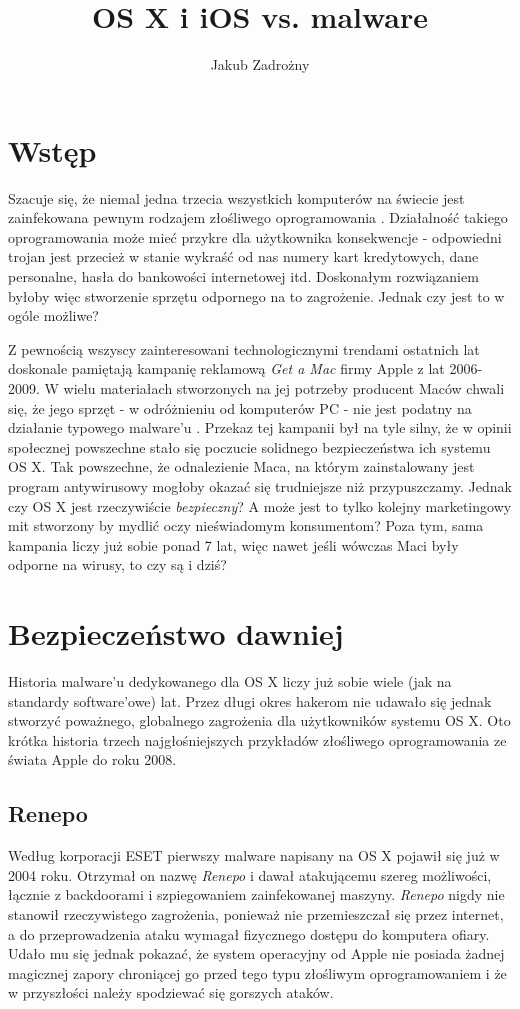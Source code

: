 \documentclass[polish]{kbk}
\begin{document}
\author{Jakub Zadrożny}
\title{OS X i iOS vs. malware}

\maketitle

\section{Wstęp}
Szacuje się, że niemal jedna trzecia wszystkich komputerów na świecie jest zainfekowana pewnym rodzajem złośliwego oprogramowania \cite{malware-scale}. Działalność takiego oprogramowania może mieć przykre dla użytkownika konsekwencje - odpowiedni trojan jest przecież w stanie wykraść od nas numery kart kredytowych, dane personalne, hasła do bankowości internetowej itd. Doskonałym rozwiązaniem byłoby więc stworzenie sprzętu odpornego na to zagrożenie. Jednak czy jest to w ogóle możliwe?

Z pewnością wszyscy zainteresowani technologicznymi trendami ostatnich lat doskonale pamiętają kampanię reklamową \textit{Get a Mac} firmy Apple z lat 2006-2009. W wielu materiałach stworzonych na jej potrzeby producent Maców chwali się, że jego sprzęt - w odróżnieniu od komputerów PC - nie jest podatny na działanie typowego malware'u \cite{get-a-mac}. Przekaz tej kampanii był na tyle silny, że w opinii społecznej powszechne stało się poczucie solidnego bezpieczeństwa ich systemu OS X. Tak powszechne, że odnalezienie Maca, na którym zainstalowany jest program antywirusowy mogłoby okazać się trudniejsze niż przypuszczamy. Jednak czy OS X jest rzeczywiście \textit{bezpieczny}? A może jest to tylko kolejny marketingowy mit stworzony by mydlić oczy nieświadomym konsumentom? Poza tym, sama kampania liczy już sobie ponad 7 lat, więc nawet jeśli wówczas Maci były odporne na wirusy, to czy są i dziś?

\section{Bezpieczeństwo dawniej}
Historia malware'u dedykowanego dla OS X liczy już sobie wiele (jak na standardy software'owe) lat. Przez długi okres hakerom nie udawało się jednak stworzyć poważnego, globalnego zagrożenia dla użytkowników systemu OS X. Oto krótka historia trzech najgłośniejszych przykładów złośliwego oprogramowania ze świata Apple do roku 2008.

\subsection{Renepo \cite{renepo}}
Według korporacji ESET pierwszy malware napisany na OS X pojawił się już w 2004 roku. Otrzymał on nazwę \textit{Renepo} i dawał atakującemu szereg możliwości, łącznie z backdoorami i szpiegowaniem zainfekowanej maszyny. \textit{Renepo} nigdy nie stanowił rzeczywistego zagrożenia, ponieważ nie przemieszczał się przez internet, a do przeprowadzenia ataku wymagał fizycznego dostępu do komputera ofiary. Udało mu się jednak pokazać, że system operacyjny od Apple nie posiada żadnej magicznej zapory chroniącej go przed tego typu złośliwym oprogramowaniem i że w przyszłości należy spodziewać się gorszych ataków.
\end{document}
